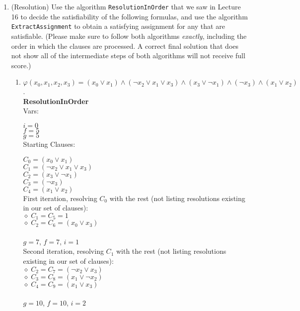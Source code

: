\documentclass[11pt]{article}
\begin{document}
\begin{enumerate}
\begin{enumerate}
  \end{enumerate}

\item (Resolution) Use the algorithm \texttt{ResolutionInOrder} that we saw in Lecture 16 to decide the satisfiability of the following formulas, and use the algorithm \texttt{ExtractAssignment} to obtain a satisfying assignment for any that are satisfiable. (Please make sure to follow both algorithms \textit{exactly}, including the order in which the clauses are processed. A correct final solution that does not show all of the intermediate steps of both algorithms will not receive full score.)
  
  \begin{enumerate}
      \item $\varphi(x_0, x_1, x_2, x_3) = (x_0 \vee x_1) \wedge (\neg x_2 \vee  x_1\vee x_3) \wedge (x_3 \vee \neg x_1) \wedge (\neg x_3) \wedge (x_1 \vee  x_2)$. \\

      \textbf{ResolutionInOrder} \\

      Vars: 

      $i = 0$ \\
      $f = 5$ \\
      $g = 5$ \\

      Starting Clauses:

      $C_0 = (x_0 \vee x_1)$ \\
      $C_1 = (\neg x_2 \vee  x_1\vee x_3)$ \\
      $C_2 = (x_3 \vee \neg x_1)$ \\
      $C_3 = (\neg x_3)$ \\
      $C_4 = (x_1 \vee  x_2)$ \\


      First iteration, resolving $C_0$ with the rest (not listing resolutions existing in our set of clauses): \\
      $\diamond \; C_1 = C_5 = 1$ \\
      $\diamond \; C_2 = C_6 = (x_0 \vee x_3)$ \\
      \\
      $g = 7$, $f=7$, $i=1$ \\

      Second iteration, resolving $C_1$ with the rest (not listing resolutions existing in our set of clauses): \\
      $\diamond \; C_2 = C_7 = (\neg x_2 \vee x_3)$ \\
      $\diamond \; C_3 = C_{8} = (x_1 \vee \neg x_2 )$ \\
      $\diamond \; C_4 = C_{9} = (x_1 \vee x_3)$ \\
      \\
      $g = 10$, $f=10$, $i=2$ \\


\end{enumerate}
\end{enumerate}
\end{document}
